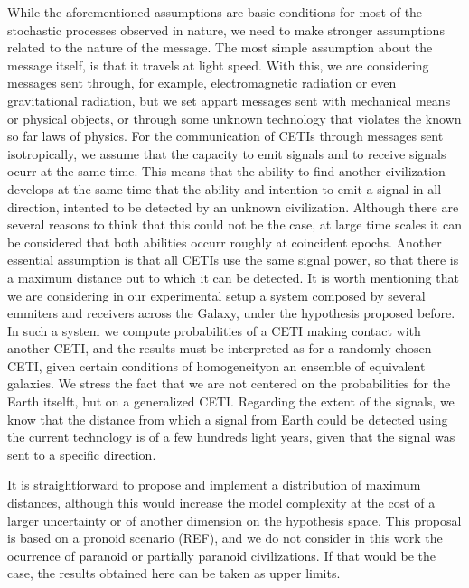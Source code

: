 \documentclass[crop]{CSLB}%
\begin{document}
While the aforementioned assumptions are basic conditions for most of
the stochastic processes observed in nature, 
we need to make stronger assumptions related to the nature of the
message.
%
The most simple assumption about the message itself, is that it
travels at light speed.
%
With this, we are considering messages sent through, for example,
electromagnetic radiation or even gravitational radiation, but we set
appart messages sent with mechanical means or physical objects, or
through some unknown technology that violates the known so far laws of
physics.
% 
For the communication of CETIs through messages sent isotropically, 
we assume that the capacity to emit signals and to receive
signals ocurr at the same time.
%
This means that the ability to find another civilization develops at
the same time that the ability and intention to emit a signal in all
direction, intented to be detected by an unknown civilization.
%
Although there are several reasons to think that this could not be the
case, at large time scales it can be considered that both abilities
occurr roughly at coincident epochs.
%
Another essential assumption is that all CETIs use the same signal power, so that there is a maximum distance out to which it can be detected.
%
It is worth mentioning that we are considering in our experimental
setup a system composed by several emmiters and receivers across the
Galaxy, under the hypothesis proposed before.
%
In such a system we compute probabilities of a CETI making contact
with another CETI, and the results must be interpreted as for a
randomly chosen CETI, given certain conditions of homogeneityon an
ensemble of equivalent galaxies.
%
We stress the fact that we are not centered on the probabilities for
the Earth itselft, but on a generalized CETI.
%
Regarding the extent of the signals, we know that the distance from
which a signal from Earth could be detected using the current
technology is of a few hundreds light years, given that the signal was
sent to a specific direction.

%
It is straightforward to propose and implement a distribution of
maximum distances, although this would increase the model complexity
at the cost of a larger uncertainty or of another dimension on the
hypothesis space.
%
This proposal is based on a pronoid scenario (REF), and we do not
consider in this work the ocurrence of paranoid or partially paranoid
civilizations.
%
If that would be the case, the results obtained here can be taken as
upper limits.
\end{document}
